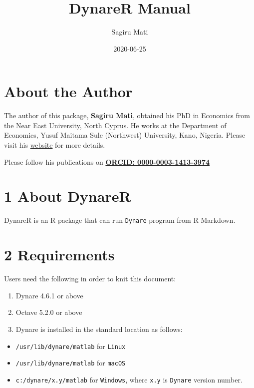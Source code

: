 \documentclass[
  letterpaper,
  DIV=11,
  numbers=noendperiod]{scrartcl}
\title{DynareR Manual}
\author{Sagiru Mati}
\date{2020-06-25}
\begin{document}
\maketitle
\ifdefined\Shaded\renewenvironment{Shaded}{\begin{tcolorbox}[frame hidden, boxrule=0pt, interior hidden, enhanced, borderline west={3pt}{0pt}{shadecolor}, sharp corners, breakable]}{\end{tcolorbox}}\fi

\hypertarget{about-the-author}{%
\section{About the Author}\label{about-the-author}}

The author of this package, \textbf{Sagiru Mati}, obtained his PhD in
Economics from the Near East University, North Cyprus. He works at the
Department of Economics, Yusuf Maitama Sule (Northwest) University,
Kano, Nigeria. Please visit his \href{https://smati.com.ng}{website} for
more details.

Please follow his publications on
\href{https://orcid.org/0000-0003-1413-3974}{\textbf{ORCID:
0000-0003-1413-3974}}

\hypertarget{about-dynarer}{%
\section{1 About DynareR}\label{about-dynarer}}

DynareR is an R package that can run \texttt{Dynare} program from R
Markdown.

\hypertarget{requirements}{%
\section{2 Requirements}\label{requirements}}

Users need the following in order to knit this document:

\begin{enumerate}
\def\labelenumi{\arabic{enumi}.}
\item
  Dynare 4.6.1 or above
\item
  Octave 5.2.0 or above
\item
  Dynare is installed in the standard location as follows:
\end{enumerate}

\begin{itemize}
\item
  \texttt{/usr/lib/dynare/matlab} for \texttt{Linux}
\item
  \texttt{/usr/lib/dynare/matlab} for \texttt{macOS}
\item
  \texttt{c:/dynare/x.y/matlab} for \texttt{Windows}, where \texttt{x.y}
  is \texttt{Dynare} version number.
\end{itemize}
\end{document}
